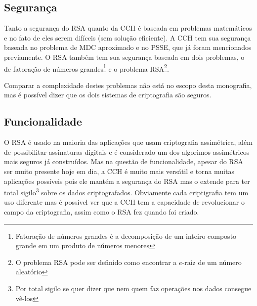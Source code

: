 	\subsection{Segurança}
	Tanto a segurança do RSA quanto da CCH é baseada em problemas matemáticos e no fato de eles serem difíceis (sem solução eficiente).
	A CCH tem sua segurança baseada no problema de MDC aproximado e no PSSE, que já foram mencionados previamente. O RSA também tem sua segurança baseada em dois problemas, o de fatoração de números grandes\footnote{Fatoração de números grandes é a decomposição de um inteiro composto grande em um produto de números menores} e o problema RSA\footnote{O problema RSA pode ser definido como encontrar a $e$-raiz de um número aleatório}.
	
	Comparar a complexidade destes problemas não está no escopo desta monografia, mas é possível dizer que os dois sistemas de criptografia são seguros.
	
	\subsection{Funcionalidade}
	O RSA é usado na maioria das aplicações que usam criptografia assimétrica, além de possibilitar assinaturas digitais e é considerado um dos algorimos assimétricos mais seguros já construídos.
	Mas na questão de funcionalidade, apesar do RSA ser muito presente hoje em dia, a CCH é muito mais versátil e torna muitas aplicações possíveis pois ele mantém a segurança do RSA mas o extende para ter total sigilo\footnote{Por total sigilo se quer dizer que nem quem faz operações nos dados consegue vê-los} sobre os dados criptografados.
	Obviamente cada criptigrafia tem um uso diferente mas é possível ver que a CCH tem a capacidade de revolucionar o campo da criptografia, assim como o RSA fez quando foi criado.